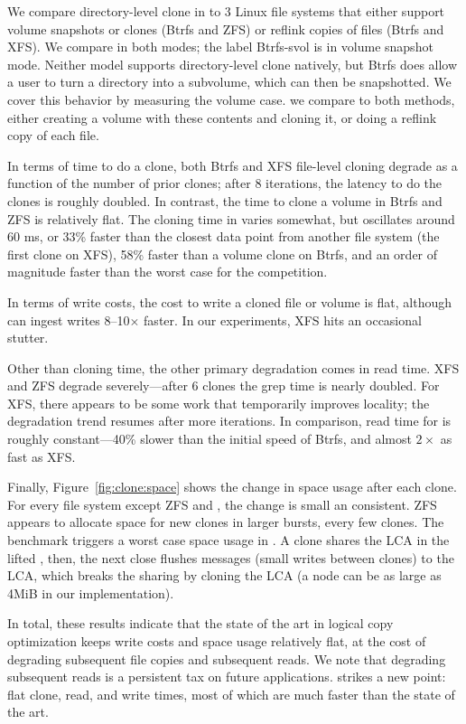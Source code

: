 We compare directory-level clone in \betrfs to 3 Linux file systems that either
support volume snapshots or clones (Btrfs and ZFS)
or reflink copies of files (Btrfs and XFS).
We compare in both modes; the label Btrfs-svol is in volume snapshot mode.
Neither model supports directory-level clone natively, but Btrfs does allow a
user to turn a directory into a subvolume, which can then be snapshotted.
We cover this behavior by measuring the volume case.
we compare to both methods, either creating a volume with these contents and
cloning it, or doing a reflink copy of each file.

In terms of time to do a clone, both Btrfs and XFS file-level cloning degrade as
a function of the number of prior clones;
after 8 iterations, the latency to do the clones is roughly doubled.
In contrast, the time to clone a volume in Btrfs and ZFS is relatively flat.
The cloning time in \betrfsFive varies somewhat, but oscillates around 60 ms, or
33\% faster than the closest data point from another file system
(the first clone on XFS), 58\% faster than a volume clone on Btrfs,
and an order of magnitude faster than the worst case for the competition.

In terms of write costs, the cost to write a cloned file or volume is flat,
although \betrfsFive can ingest writes 8--10$\times$ faster.
In our experiments, XFS hits an occasional stutter.

Other than cloning time, the other primary degradation comes in read time.
XFS and ZFS degrade severely---after 6 clones the grep time is nearly doubled.
For XFS, there appears to be some work that temporarily improves locality;
the degradation trend resumes after more iterations.
In comparison, read time for \betrfsFive is roughly constant---40\% slower than
the initial speed of Btrfs, and almost $2\times$ as fast as XFS.

Finally, Figure~\ref{fig:clone:space} shows the change in space usage after
each clone.
For every file system except ZFS and \betrfsFive, the change is small an
consistent.
ZFS appears to allocate space for new clones in larger bursts, every few clones.
The benchmark triggers a worst case space usage in \betrfsFive.
A clone shares the LCA in the lifted \bedag, then, the next close flushes
messages (small writes between clones) to the LCA, which breaks the sharing
by cloning the LCA (a node can be as large as 4MiB in our implementation).

In total, these results indicate that the state of the art in logical copy
optimization keeps write costs and space usage relatively flat,
at the cost of degrading subsequent file copies and subsequent reads.
We note that degrading subsequent reads is a persistent tax on future
applications.
\betrfsFive strikes a new point: flat clone, read, and write times,
most of which are much faster than the state of the art.

